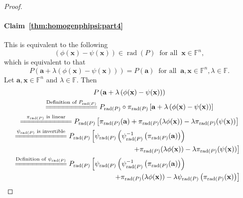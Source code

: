 \documentclass{elsarticle}
\DeclareMathOperator{\rad}{rad}
\def\F{{\mathbb F}}
\theoremstyle{definition}
\numberwithin{equation}{section}
\begin{document}
\begin{proof}
\paragraph{Claim~\ref{thm:homogenphipsi:part4}}%
This is equivalent to the following
\begin{equation*}\label{thm:homogenphipsi:eq14}
\left(\phi(\mathbf x) - \psi(\mathbf x)\right) \in \rad(P)\;\;\mbox{for all}\;\;\mathbf x \in \F^n,
\end{equation*}
which is equivalent to that
\begin{equation}\label{thm:homogenphipsi:eq15}
P(\mathbf a + \lambda \left(\phi(\mathbf x) - \psi(\mathbf x)\right)) = P(\mathbf a)\;\;\mbox{for all}\;\;\mathbf a, \mathbf x \in \F^n, \lambda \in \F.
\end{equation}
Let $\mathbf a, \mathbf x \in \F^n$ and $\lambda  \in \F.$ Then
{\setlength{\jot}{15pt}
\begin{multline*}\label{thm:homogenphipsi:eq16}
P\left(\mathbf a + \lambda\left(\phi(\mathbf x) - \psi(\mathbf x)\right)\right)\\
\overset{\scriptsize\mbox{Definition of $P_{\rad(P)}$}}{=\joinrel=\joinrel=\joinrel=\joinrel=\joinrel=\joinrel=\joinrel=\joinrel=\joinrel=\joinrel=\joinrel=}
P_{\rad(P)} \circ \pi_{\rad(P)}\left[\mathbf a + \lambda\left(\phi(\mathbf x) - \psi(\mathbf x)\right)\right]\\
\overset{\scriptsize\mbox{$\pi_{\rad(P)}$ is linear}}{=\joinrel=\joinrel=\joinrel=\joinrel=\joinrel=\joinrel=\joinrel=\joinrel=\joinrel=\joinrel=\joinrel=}
P_{\rad(P)} \left[\pi_{\rad(P)}(\mathbf a) + \pi_{\rad(P)}( \lambda \phi(\mathbf x)) - \lambda\pi_{\rad(P)}( \psi(\mathbf x))\right]\\
\overset{\scriptsize\mbox{$\psi_{\rad(P)}$ is invertible}}{=\joinrel=\joinrel=\joinrel=\joinrel=\joinrel=\joinrel=\joinrel=\joinrel=\joinrel=\joinrel=\joinrel=}
P_{\rad(P)} \left[\psi_{\rad(P)}\left(\psi_{\rad(P)}^{-1}\left(\pi_{\rad(P)}(\mathbf a)\right)\right)\right.\phantom{XXXXXXXXX}\\\phantom{XXXXXXXXXXXXXXXXXX}\left.
+ \pi_{\rad(P)}(\lambda  \phi(\mathbf x)) - \lambda \pi_{\rad(P)}( \psi(\mathbf x))\right]\\
\overset{\scriptsize\mbox{Definition of $\psi_{\rad(P)}$}}{=\joinrel=\joinrel=\joinrel=\joinrel=\joinrel=\joinrel=\joinrel=\joinrel=\joinrel=\joinrel=\joinrel=}
P_{\rad(P)} \left[\psi_{\rad(P)}\left(\psi_{\rad(P)}^{-1}\left(\pi_{\rad(P)}(\mathbf a)\right)\right)\right.\phantom{XXXXXXXXX}\\\phantom{XXXXXXXXXXXXXXX}\left. + \pi_{\rad(P)}( \lambda \phi(\mathbf x)) - \lambda \psi_{\rad(P)}\left(\pi_{\rad(P)}(\mathbf x)\right)\right]\\

\end{multline*}}
\end{proof}
\end{document}
